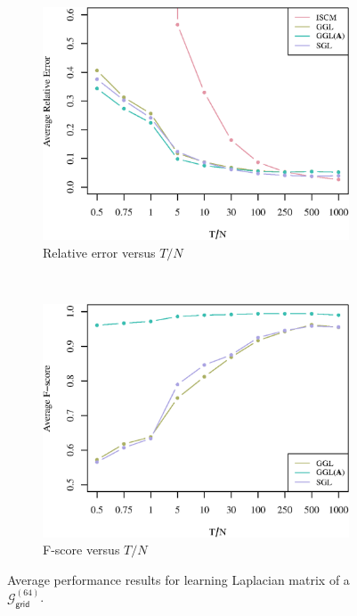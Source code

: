 \documentclass{article}
\begin{document}
\begin{figure}[!htb]
    \centering
    \begin{subfigure}[b]{0.47\textwidth}
        \includegraphics[width=\textwidth]{relative_error_grid.eps}
        \caption{Relative error versus $T/N$}
    \end{subfigure}
    ~ %
    \begin{subfigure}[b]{0.47\textwidth}
        \includegraphics[width=\textwidth]{fscore_grid.eps}
        \caption{F-score versus $T/N$}
    \end{subfigure}
    \caption{Average performance results for learning Laplacian matrix of a $\mathcal{G}^{(64)}_{\mathsf{grid}}$.}
    \label{fig:performance}
\end{figure}
\end{document}
